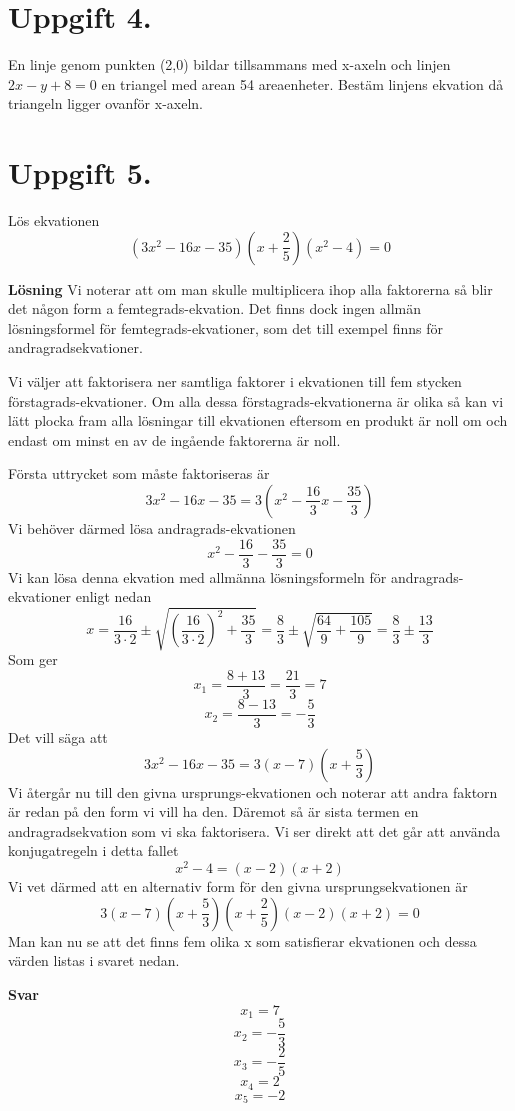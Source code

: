 \documentclass[fleqn]{article}
\begin{document}
\newpage
\section*{Uppgift 4.}
En linje genom punkten (2,0) bildar tillsammans med x-axeln och linjen $2x-y+8=0$ en triangel med arean 54 areaenheter. Bestäm linjens ekvation då triangeln ligger ovanför x-axeln.

\newpage
\section*{Uppgift 5.}

Lös ekvationen
\[
(3x^2 - 16x - 35)(x + \dfrac{2}{5})(x^2-4)=0
\]

\textbf{Lösning}
Vi noterar att om man skulle multiplicera ihop alla faktorerna så blir det någon form a femtegrads-ekvation. Det finns dock ingen allmän lösningsformel för femtegrads-ekvationer, som det till exempel finns för andragradsekvationer.

Vi väljer att faktorisera ner samtliga faktorer i ekvationen till fem stycken förstagrads-ekvationer. Om alla dessa förstagrads-ekvationerna är olika så kan vi lätt plocka fram alla lösningar till ekvationen eftersom en produkt är noll om och endast om minst en av de ingående faktorerna är noll.

Första uttrycket som måste faktoriseras är 
\[
3x^2 - 16x - 35 = 3(x^2 - \dfrac{16}{3}x - \dfrac{35}{3})
\]
Vi behöver därmed lösa andragrads-ekvationen
\[
x^2 - \dfrac{16}{3} - \dfrac{35}{3} = 0 
\]
Vi kan lösa denna ekvation med allmänna lösningsformeln för andragrads-ekvationer enligt nedan
\[
x = \dfrac{16}{3 \cdot 2} \pm \sqrt{\left(\dfrac{16}{3 \cdot 2}\right) ^2+\dfrac{35}{3}} 
= \dfrac{8}{3} \pm \sqrt{\dfrac{64}{9}+\dfrac{105}{9}}
= \dfrac{8}{3} \pm \dfrac{13}{3}
\]
Som ger
\[
x_1 = \dfrac{8+13}{3} = \dfrac{21}{3} = 7
\]
\[
x_2 = \dfrac{8-13}{3} = -\dfrac{5}{3}
\]
Det vill säga att
\[
3x^2 - 16x - 35 = 3(x - 7)(x + \dfrac{5}{3})
\]
Vi återgår nu till den givna ursprungs-ekvationen och noterar att andra faktorn är redan på den form vi vill ha den. Däremot så är sista termen en andragradsekvation som vi ska faktorisera. Vi ser direkt att det går att använda konjugatregeln i detta fallet
\[
x^2 - 4=(x-2)(x+2)
\]
Vi vet därmed att en alternativ form för den givna ursprungsekvationen är
\[
3(x-7)(x + \dfrac{5}{3})(x + \dfrac{2}{5})(x - 2)(x + 2) = 0
\]
Man kan nu se att det finns fem olika x som satisfierar ekvationen och dessa värden listas i svaret nedan.

\textbf{Svar}
\[
x_1 = 7 
\]
\[
x_2 = -\dfrac{5}{3} 
\]
\[
x_3 = -\dfrac{2}{5} 
\]
\[
x_4 = 2
\]
\[
x_5 = -2
\]
\end{document}
